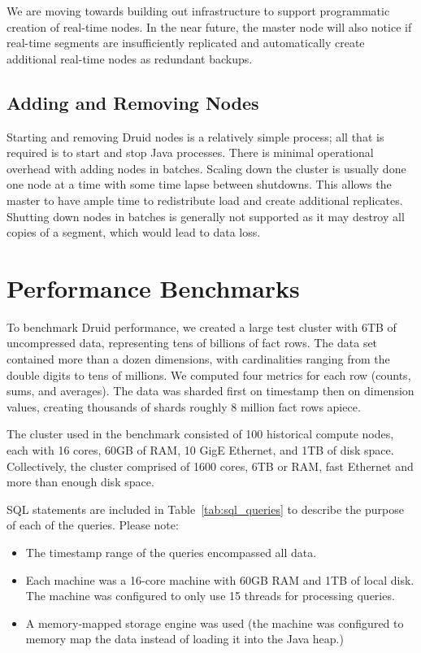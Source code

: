 \documentclass{vldb}
\begin{document}
We are moving towards building out infrastructure to support
programmatic creation of real-time nodes. In the near future, the
master node will also notice if real-time segments are insufficiently
replicated and automatically create additional real-time nodes as
redundant backups.

\subsection{Adding and Removing Nodes}
Starting and removing Druid nodes is a relatively simple process; all
that is required is to start and stop Java processes. There is minimal
operational overhead with adding nodes in batches. Scaling down the
cluster is usually done one node at a time with some time lapse
between shutdowns. This allows the master to have ample time to
redistribute load and create additional replicates. Shutting down
nodes in batches is generally not supported as it may destroy all
copies of a segment, which would lead to data loss.

\section{Performance Benchmarks}
\label{sec:benchmarks}
To benchmark Druid performance, we created a large test cluster with
6TB of uncompressed data, representing tens of billions of fact
rows. The data set contained more than a dozen dimensions, with
cardinalities ranging from the double digits to tens of millions. We computed
four metrics for each row (counts, sums, and averages). The data was
sharded first on timestamp then on dimension values, creating
thousands of shards roughly 8 million fact rows apiece.

The cluster used in the benchmark consisted of 100 historical compute
nodes, each with 16 cores, 60GB of RAM, 10 GigE Ethernet, and 1TB of
disk space. Collectively, the cluster comprised of 1600 cores, 6TB or
RAM, fast Ethernet and more than enough disk space.

SQL statements are included in Table~\ref{tab:sql_queries} to describe the
purpose of each of the queries. Please note:
\begin{itemize}
\item The timestamp range of the queries encompassed all data.
\item Each machine was a 16-core machine with 60GB RAM and 1TB of local
  disk. The machine was configured to only use 15 threads for
  processing queries.
\item A memory-mapped storage engine was used (the machine was configured to memory map the data
  instead of loading it into the Java heap.)
\end{itemize}
\end{document}

